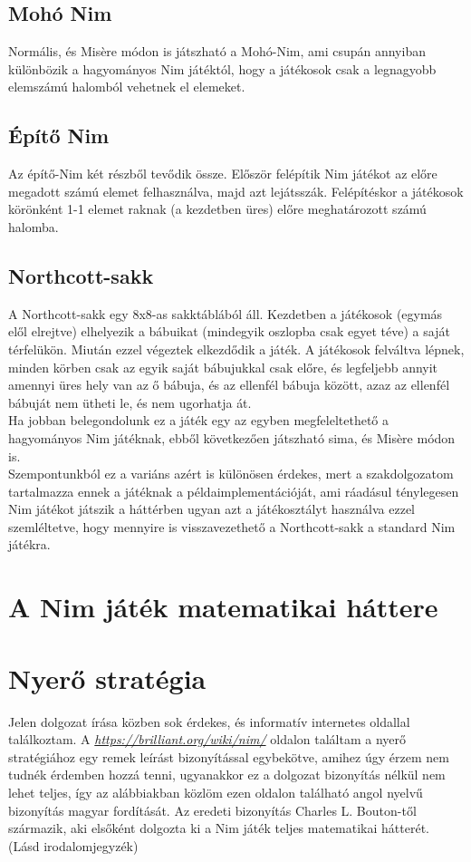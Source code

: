 \subsection{Mohó Nim}
Normális, és Misère módon is játszható a Mohó-Nim, ami csupán annyiban különbözik a hagyományos Nim játéktól, hogy a játékosok csak a legnagyobb elemszámú halomból vehetnek el elemeket.

\subsection{Építő Nim}
Az építő-Nim két részből tevődik össze. Először felépítik Nim játékot az előre megadott számú elemet felhasználva, majd azt lejátsszák. Felépítéskor a játékosok körönként 1-1 elemet raknak (a kezdetben üres) előre meghatározott számú halomba.

\subsection{Northcott-sakk}
A Northcott-sakk egy 8x8-as sakktáblából áll. Kezdetben a játékosok (egymás elől elrejtve) elhelyezik a bábuikat (mindegyik oszlopba csak egyet téve) a saját térfelükön. Miután ezzel végeztek elkezdődik a játék. A játékosok felváltva lépnek, minden körben csak az egyik saját bábujukkal csak előre, és legfeljebb annyit amennyi üres hely van az ő bábuja, és az ellenfél bábuja között, azaz az ellenfél bábuját nem ütheti le, és nem ugorhatja át.\\
Ha jobban belegondolunk ez a játék egy az egyben megfeleltethető a hagyományos Nim játéknak, ebből következően játszható sima, és Misère módon is.\\ 
Szempontunkból ez a variáns azért is különösen érdekes, mert a szakdolgozatom tartalmazza ennek a játéknak a példaimplementációját, ami ráadásul ténylegesen Nim játékot játszik a háttérben ugyan azt a játékosztályt használva ezzel szemléltetve, hogy mennyire is visszavezethető a Northcott-sakk a standard Nim játékra.

\section{A Nim játék matematikai háttere}

\section{Nyerő stratégia}
Jelen dolgozat írása közben sok érdekes, és informatív internetes oldallal találkoztam. A {\em \url{ https://brilliant.org/wiki/nim/}} oldalon találtam a nyerő stratégiához egy remek leírást bizonyítással egybekötve, amihez úgy érzem nem tudnék érdemben hozzá tenni, ugyanakkor ez a dolgozat bizonyítás nélkül nem lehet teljes, így az alábbiakban közlöm ezen oldalon található angol nyelvű bizonyítás magyar fordítását. Az eredeti bizonyítás Charles L. Bouton-től származik, aki elsőként dolgozta ki a Nim játék teljes matematikai hátterét. (Lásd irodalomjegyzék) \\ \\

